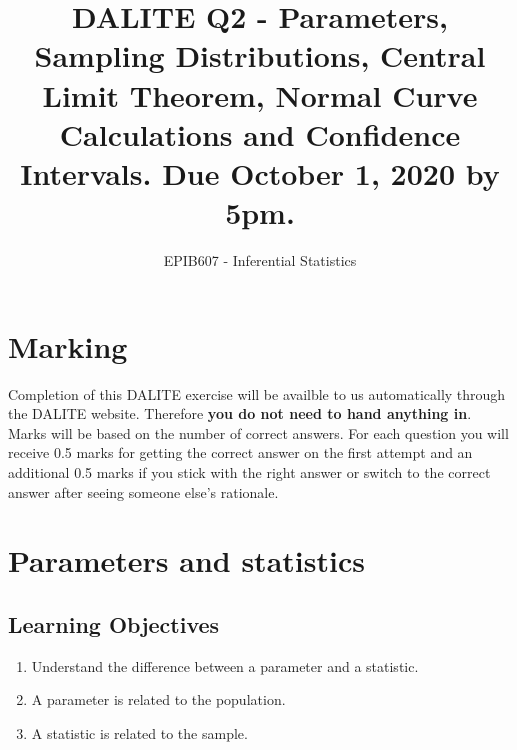 \documentclass[letterpaper,12pt,twoside,]{pinp}
\title{DALITE Q2 - Parameters, Sampling Distributions, Central Limit Theorem,
Normal Curve Calculations and Confidence Intervals. Due October 1, 2020
by 5pm.}
\author[a]{EPIB607 - Inferential Statistics}
\affil[a]{Fall 2020, McGill University}
\providecommand{\tightlist}{%
  \setlength{\itemsep}{0pt}\setlength{\parskip}{0pt}}
\begin{document}
\verticaladjustment{-2pt}

\maketitle
\thispagestyle{firststyle}



\hypertarget{marking}{%
\section*{Marking}\label{marking}}

Completion of this DALITE exercise will be availble to us automatically
through the DALITE website. Therefore \textbf{you do not need to hand
anything in}. Marks will be based on the number of correct answers. For
each question you will receive 0.5 marks for getting the correct answer
on the first attempt and an additional 0.5 marks if you stick with the
right answer or switch to the correct answer after seeing someone else's
rationale.

\hypertarget{parameters-and-statistics}{%
\section{Parameters and statistics}\label{parameters-and-statistics}}

\hypertarget{learning-objectives}{%
\subsection{Learning Objectives}\label{learning-objectives}}

\begin{enumerate}
\def\labelenumi{\arabic{enumi}.}
\tightlist
\item
  Understand the difference between a parameter and a statistic.
\item
  A parameter is related to the population.
\item
  A statistic is related to the sample.
\end{enumerate}
\end{document}
